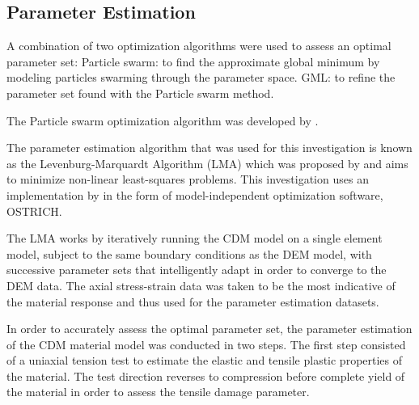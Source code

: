 \subsection{Parameter Estimation}
A combination of two optimization algorithms were used to assess an optimal parameter set:
Particle swarm: to find the approximate global minimum by modeling particles swarming through the parameter space. 
GML: to refine the parameter set found with the Particle swarm method.

The Particle swarm optimization algorithm was developed by . 

The parameter estimation algorithm that was used for this investigation is known as the Levenburg-Marquardt Algorithm (LMA) which was proposed by \citet{marquardt_algorithm_1963} and aims to minimize non-linear least-squares problems. This investigation uses an implementation by \citet{matott_ostrich:_2008} in the form of model-independent optimization software, OSTRICH.

The LMA works by iteratively running the CDM model on a single element model, subject to the same boundary conditions as the DEM model, with successive parameter sets that intelligently adapt in order to converge to the DEM data. The axial stress-strain data was taken to be the most indicative of the material response and thus used for the parameter estimation datasets.

In order to accurately assess the optimal parameter set, the parameter estimation of the CDM material model was conducted in two steps. The first step consisted of a uniaxial tension test to estimate the elastic and tensile plastic properties of the material. The test direction reverses to compression before complete yield of the material in order to assess the tensile damage parameter. 

